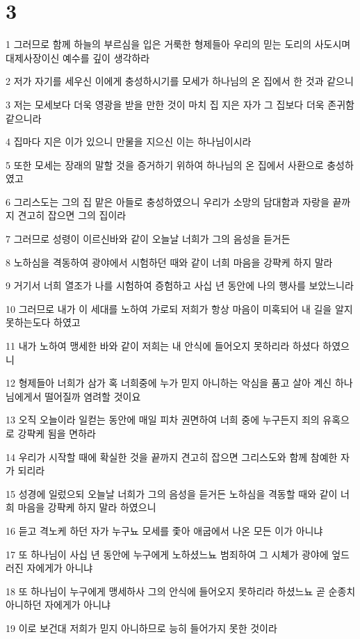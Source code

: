 \chapter{3}

\par 1 그러므로 함께 하늘의 부르심을 입은 거룩한 형제들아 우리의 믿는 도리의 사도시며 대제사장이신 예수를 깊이 생각하라
\par 2 저가 자기를 세우신 이에게 충성하시기를 모세가 하나님의 온 집에서 한 것과 같으니
\par 3 저는 모세보다 더욱 영광을 받을 만한 것이 마치 집 지은 자가 그 집보다 더욱 존귀함 같으니라
\par 4 집마다 지은 이가 있으니 만물을 지으신 이는 하나님이시라
\par 5 또한 모세는 장래의 말할 것을 증거하기 위하여 하나님의 온 집에서 사환으로 충성하였고
\par 6 그리스도는 그의 집 맡은 아들로 충성하였으니 우리가 소망의 담대함과 자랑을 끝까지 견고히 잡으면 그의 집이라
\par 7 그러므로 성령이 이르신바와 같이 오늘날 너희가 그의 음성을 듣거든
\par 8 노하심을 격동하여 광야에서 시험하던 때와 같이 너희 마음을 강퍅케 하지 말라
\par 9 거기서 너희 열조가 나를 시험하여 증험하고 사십 년 동안에 나의 행사를 보았느니라
\par 10 그러므로 내가 이 세대를 노하여 가로되 저희가 항상 마음이 미혹되어 내 길을 알지 못하는도다 하였고
\par 11 내가 노하여 맹세한 바와 같이 저희는 내 안식에 들어오지 못하리라 하셨다 하였으니
\par 12 형제들아 너희가 삼가 혹 너희중에 누가 믿지 아니하는 악심을 품고 살아 계신 하나님에게서 떨어질까 염려할 것이요
\par 13 오직 오늘이라 일컫는 동안에 매일 피차 권면하여 너희 중에 누구든지 죄의 유혹으로 강퍅케 됨을 면하라
\par 14 우리가 시작할 때에 확실한 것을 끝까지 견고히 잡으면 그리스도와 함께 참예한 자가 되리라
\par 15 성경에 일렀으되 오늘날 너희가 그의 음성을 듣거든 노하심을 격동할 때와 같이 너희 마음을 강퍅케 하지 말라 하였으니
\par 16 듣고 격노케 하던 자가 누구뇨 모세를 좇아 애굽에서 나온 모든 이가 아니냐
\par 17 또 하나님이 사십 년 동안에 누구에게 노하셨느뇨 범죄하여 그 시체가 광야에 엎드러진 자에게가 아니냐
\par 18 또 하나님이 누구에게 맹세하사 그의 안식에 들어오지 못하리라 하셨느뇨 곧 순종치 아니하던 자에게가 아니냐
\par 19 이로 보건대 저희가 믿지 아니하므로 능히 들어가지 못한 것이라

